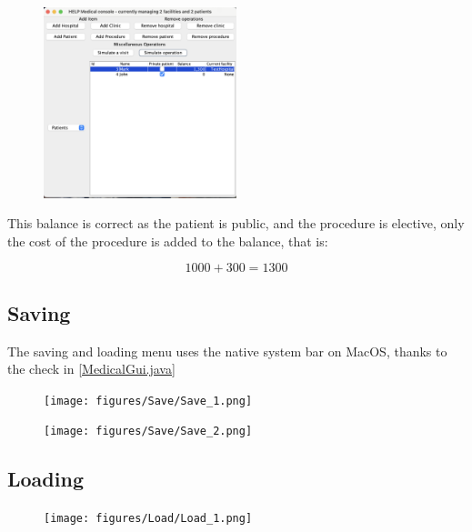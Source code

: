 \documentclass{article}
\begin{document}
\begin{figure}
  \begin{center}
    \includegraphics[width=0.5\textwidth]{./figures/Operation/Operation_6.png}
  \end{center}
\end{figure}

This balance is correct as the patient is public, and the procedure is elective, only the cost of the procedure is added to the balance, that is: 

\[
  1000 + 300 = 1300
\]

\subsection{Saving}\label{sub:saving} %
The saving and loading menu uses the native system bar on MacOS, thanks to the check in \ref{MedicalGui.java}\cite{macos_titlebar}
\begin{figure}[ht]
  \begin{center}
    \texttt{[image: figures/Save/Save\_1.png]}
  \end{center}
\end{figure}

\begin{figure}[ht]
  \begin{center}
    \texttt{[image: figures/Save/Save\_2.png]}
  \end{center}
\end{figure}

\subsection{Loading}\label{sub:loading} %
\begin{figure}[ht]
  \begin{center}
    \texttt{[image: figures/Load/Load\_1.png]}
  \end{center}
\end{figure}
\end{document}
